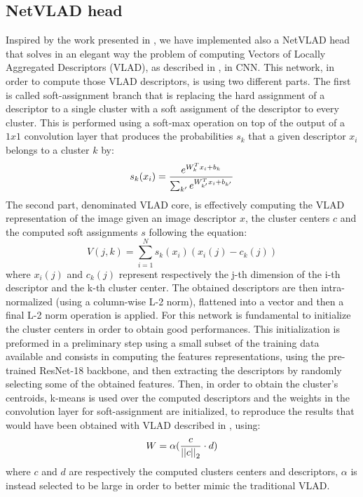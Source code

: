 \documentclass[10pt,twocolumn,letterpaper]{article}
\begin{document}
	\subsection{NetVLAD head}\label{sec:NETVLAD}
	Inspired by the work presented in \cite{NETVLAD}, we have implemented also a NetVLAD head that solves in an 
	elegant way the problem of computing Vectors of Locally Aggregated Descriptors (VLAD), as described in \cite{VLAD},
	in CNN. This network, in order to compute those VLAD descriptors, is using two different parts. 
	The first is called soft-assignment branch that is replacing the hard assignment of a descriptor to a single cluster
	with a soft assignment of the descriptor to every cluster. This is performed using a soft-max operation on top of the output of a $1x1$
	convolution layer that produces the probabilities $s_k$ that a given descriptor $x_i$ belongs to a cluster $k$ by:
	\begin{equation}
		s_k(x_i) = {{e^{W_k^T x_i+b_k}}\over{\sum_{k'} e^{W_{k'}^T x_i+b_{k'}}}}
	\end{equation} 
	The second part, denominated VLAD core, is effectively computing the 
	VLAD representation of the image given an image descriptor $x$, the cluster centers $c$ and the computed soft assignments
	$s$ following the equation:
	\begin{equation}
		V(j,k) = \sum_{i=1}^N s_k(x_i) (x_i(j) - c_k(j))
	\end{equation} 
	where $x_i(j)$ and $c_k(j)$ represent respectively the j-th dimension of the i-th descriptor and the k-th cluster center.
	The obtained descriptors are then intra-normalized (using a column-wise L-2 norm), flattened into a vector and then a
	final L-2 norm operation is applied.
	For this network is fundamental to initialize the cluster centers in order to obtain good performances. This initialization
	is preformed in a preliminary step using a small subset of the training data available and consists in computing the features 
	representations, using the pre-trained ResNet-18 backbone, and then extracting the descriptors by randomly selecting some of the 
	obtained features. Then, in order to obtain the cluster's centroids, k-means is used over the computed descriptors and the 
	weights in the convolution layer for soft-assignment are initialized, to reproduce the results that would have been obtained
	with VLAD described in \cite{VLAD}, using:
	\begin{equation}
		W = \alpha ({{c}\over{{||c||}_2}} \cdot d )
	\end{equation}
	where $c$ and $d$ are respectively the computed clusters centers and descriptors, $\alpha$ is instead selected to be large
	in order to better mimic the traditional VLAD.
	
\end{document}
